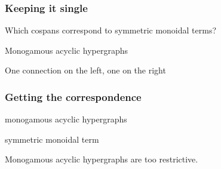 \begin{frame}
    \frametitle{Keeping it single}

    \Large
    Which cospans correspond to \alert{symmetric monoidal} terms?

    \pause

    \centering
    \LARGE
    \alert{Monogamous acyclic} hypergraphs

    \scalebox{0.5}{\hypergraphpeople}

    \normalsize

    One connection on the \alert{left}, one on the \alert{right}

    \pause
    \vspace{1em}


\end{frame}
\begin{frame}
    \frametitle{Getting the correspondence}

    \centering

    \begin{minipage}{0.45\textwidth}
        \begin{center}
            \alert{monogamous acyclic} hypergraphs

            \vspace{1em}

        \end{center}
    \end{minipage}
    \quad
    \raisebox{-1em}{\(\leftrightarrow\)}
    \pause
    \begin{minipage}{0.45\textwidth}
        \begin{center}
            symmetric monoidal term

            \vspace{1em}

        \end{center}
    \end{minipage}

    \vspace{1em}
    \normalsize
    \scalebox{0.75}{\hypergraphpeople}

    \Large
    \pause
    Monogamous acyclic hypergraphs are \alert{too restrictive}.

\end{frame}
